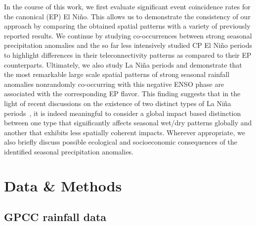 \documentclass[utf8]{frontiersSCNS} %
\begin{document}
In the course of this work, we first evaluate significant event coincidence rates for the canonical (EP) El Ni\~no. This allows us to demonstrate the consistency of our approach by comparing the obtained spatial patterns with a variety of previously reported results. We continue by studying co-occurrences between strong seasonal precipitation anomalies and the so far less intensively studied CP El Ni\~no periods to highlight differences in their teleconnectivity patterns as compared to their EP counterparts. Ultimately, we also study La Ni\~na periods and demonstrate that the most remarkable large scale spatial patterns of strong seasonal rainfall anomalies nonrandomly co-occurring with this negative ENSO phase are associated with the corresponding EP flavor. This finding suggests that in the light of recent discussions on the existence of two distinct types of La Ni\~na periods~\citep{kug_are_2011, kao_contrasting_2009, ren_nino_2011, zhang2015impacts}, it is indeed meaningful to consider a global impact based distinction between one type that significantly affects seasonal wet/dry patterns globally and another that exhibits less spatially coherent impacts. Wherever appropriate, we also briefly discuss possible ecological and socioeconomic consequences of the identified seasonal precipitation anomalies. 

\section{Data \& Methods}

\subsection{GPCC rainfall data}
\end{document}
